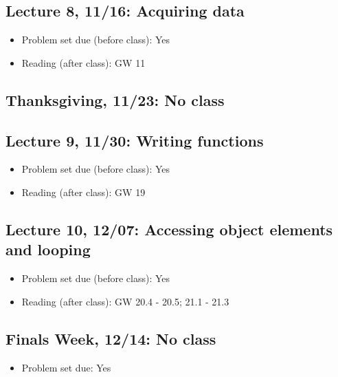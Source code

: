 \documentclass[11pt,]{article}
\providecommand{\tightlist}{%
  \setlength{\itemsep}{0pt}\setlength{\parskip}{0pt}}
\begin{document}
\subsection{Lecture 8, 11/16: Acquiring
data}\label{lecture-8-1116-acquiring-data}

\begin{itemize}
\tightlist
\item
  Problem set due (before class): Yes
\item
  Reading (after class): GW 11
\end{itemize}

\subsection{Thanksgiving, 11/23: No
class}\label{thanksgiving-1123-no-class}

\subsection{Lecture 9, 11/30: Writing
functions}\label{lecture-9-1130-writing-functions}

\begin{itemize}
\tightlist
\item
  Problem set due (before class): Yes
\item
  Reading (after class): GW 19
\end{itemize}

\subsection{Lecture 10, 12/07: Accessing object elements and
looping}\label{lecture-10-1207-accessing-object-elements-and-looping}

\begin{itemize}
\tightlist
\item
  Problem set due (before class): Yes
\item
  Reading (after class): GW 20.4 - 20.5; 21.1 - 21.3
\end{itemize}

\subsection{Finals Week, 12/14: No
class}\label{finals-week-1214-no-class}

\begin{itemize}
\tightlist
\item
  Problem set due: Yes
\end{itemize}
\end{document}
